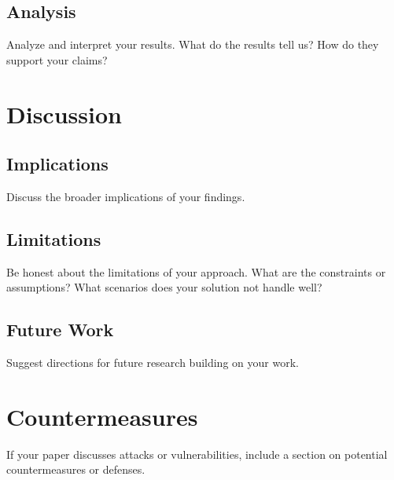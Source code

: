 \documentclass[10pt,conference]{IEEEtran}
\begin{document}
\subsection{Analysis}
Analyze and interpret your results. What do the results tell us? How do they support your claims?

\section{Discussion}
\label{sec:discussion}

\subsection{Implications}
Discuss the broader implications of your findings.

\subsection{Limitations}
Be honest about the limitations of your approach. What are the constraints or assumptions? What scenarios does your solution not handle well?

\subsection{Future Work}
Suggest directions for future research building on your work.

\section{Countermeasures}
\label{sec:countermeasures}

If your paper discusses attacks or vulnerabilities, include a section on potential countermeasures or defenses.

%

\end{document}
